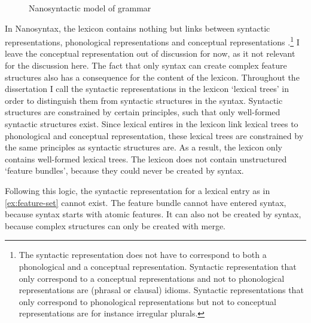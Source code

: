 \begin{figure}[ht]
  \centering
  \caption{Nanosyntactic model of grammar}
  \label{fig:nano}
\end{figure}

In Nanosyntax, the lexicon contains nothing but links between syntactic representations, phonological representations and conceptual representations \citep{starke2014}.\footnote{
The syntactic representation does not have to correspond to both a phonological and a conceptual representation. Syntactic representation that only correspond to a conceptual representations and not to phonological representations are (phrasal or clausal) idioms. Syntactic representations that only correspond to phonological representations but not to conceptual representations are for instance irregular plurals.
} I leave the conceptual representation out of discussion for now, as it not relevant for the discussion here. The fact that only syntax can create complex feature structures also has a consequence for the content of the lexicon.
Throughout the dissertation I call the syntactic representations in the lexicon `lexical trees' in order to distinguish them from syntactic structures in the syntax.
Syntactic structures are constrained by certain principles, such that only well-formed syntactic structures exist. Since lexical entires in the lexicon link lexical trees to phonological and conceptual representation, these lexical trees are constrained by the same principles as syntactic structures are. As a result, the lexicon only contains well-formed lexical trees. The lexicon does not contain unstructured `feature bundles', because they could never be created by syntax.

Following this logic, the syntactic representation for a lexical entry as in \ref{ex:feature-set} cannot exist. The feature bundle cannot have entered syntax, because syntax starts with atomic features. It can also not be created by syntax, because complex structures can only be created with merge.

